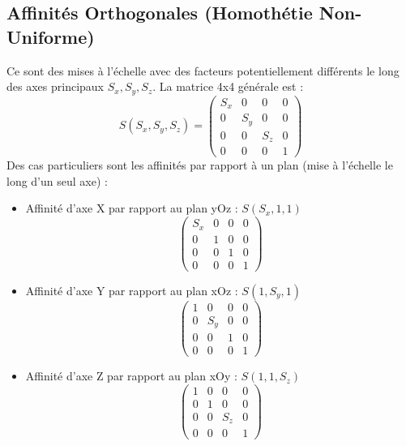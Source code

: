 \documentclass{article}
\begin{document}
\subsection{Affinités Orthogonales (Homothétie Non-Uniforme)}
Ce sont des mises à l'échelle avec des facteurs potentiellement différents le long des axes principaux $S_x, S_y, S_z$. La matrice 4x4 générale est :
\[ S(S_x, S_y, S_z) = \begin{pmatrix} S_x & 0 & 0 & 0 \\ 0 & S_y & 0 & 0 \\ 0 & 0 & S_z & 0 \\ 0 & 0 & 0 & 1 \end{pmatrix} \]
Des cas particuliers sont les affinités par rapport à un plan (mise à l'échelle le long d'un seul axe) :
\begin{itemize}
    \item Affinité d'axe X par rapport au plan yOz : $S(S_x, 1, 1)$
    \[ \begin{pmatrix} S_x & 0 & 0 & 0 \\ 0 & 1 & 0 & 0 \\ 0 & 0 & 1 & 0 \\ 0 & 0 & 0 & 1 \end{pmatrix} \]
    \item Affinité d'axe Y par rapport au plan xOz : $S(1, S_y, 1)$
    \[ \begin{pmatrix} 1 & 0 & 0 & 0 \\ 0 & S_y & 0 & 0 \\ 0 & 0 & 1 & 0 \\ 0 & 0 & 0 & 1 \end{pmatrix} \]
    \item Affinité d'axe Z par rapport au plan xOy : $S(1, 1, S_z)$
    \[ \begin{pmatrix} 1 & 0 & 0 & 0 \\ 0 & 1 & 0 & 0 \\ 0 & 0 & S_z & 0 \\ 0 & 0 & 0 & 1 \end{pmatrix} \]
\end{itemize}
\end{document}
